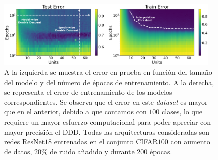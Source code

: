 \begin{figure}[h]
    \centering
    \includegraphics[width=0.95\textwidth]{img/experiments/model-epochPreActResNet18CIFAR100augmented.png}
    \caption[Doble descenso en función del tamaño del modelo y del número de épocas para la red ResNet$18$ y el conjunto CIFAR$100$.]{A la izquierda se muestra el error en prueba en función del tamaño del modelo y del número de épocas de entrenamiento. A la derecha, se representa el error de entrenamiento de los modelos correspondientes. Se observa que el error en este \textit{dataset} es mayor que en el anterior, debido a que contamos con $100$ clases, lo que requiere un mayor esfuerzo computacional para poder apreciar con mayor precisión el DDD. Todas las arquitecturas consideradas son redes ResNet$18$ entrenadas en el conjunto CIFAR$100$ con aumento de datos, $20\%$ de ruido añadido y durante $200$ épocas.}\label{fig:model-epochPreActResNet18CIFAR100}
\end{figure}

